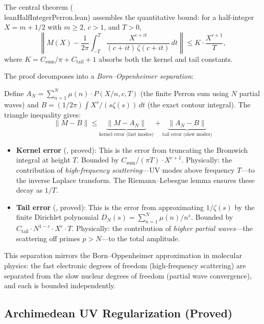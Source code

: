\documentclass[11pt,a4paper]{article}
\begin{document}
The central theorem 
(\\lean{HalfIntegerPerron.lean}) assembles the quantitative bound:
for a half-integer $X = m + 1/2$ with $m \geq 2$, $c > 1$, and $T > 0$,
\[
  \left\| M(X) - \frac{1}{2\pi} \int_{-T}^{T}
  \frac{X^{c+it}}{(c+it)\,\zeta(c+it)}\,dt \right\|
  \leq K \cdot \frac{X^{c+1}}{T},
\]
where $K = C_{\mathrm{sum}}/\pi + C_{\mathrm{tail}} + 1$ absorbs
both the kernel and tail constants.

The proof decomposes into a \emph{Born--Oppenheimer separation}:

\begin{correspondence}
\label{corr:born-oppenheimer}
Define $A_N = \sum_{n=1}^{N} \mu(n) \cdot P(X/n, c, T)$ (the finite
Perron sum using $N$ partial waves) and $B = (1/2\pi)\int X^s/(s\zeta(s))\,dt$
(the exact contour integral). The triangle inequality gives:
\[
  \|M - B\| \leq \underbrace{\|M - A_N\|}_{\text{kernel error (fast modes)}}
  + \underbrace{\|A_N - B\|}_{\text{tail error (slow modes)}}
\]
\begin{itemize}
  \item \textbf{Kernel error} (,
    proved): This is the error from truncating the Bromwich integral at
    height $T$. Bounded by $C_{\mathrm{sum}}/(\pi T) \cdot X^{c+1}$.
    Physically: the contribution of \emph{high-frequency scattering}---UV
    modes above frequency $T$---to the inverse Laplace transform. The
    Riemann--Lebesgue lemma ensures these decay as $1/T$.

  \item \textbf{Tail error} (,
    proved): This is the error from approximating $1/\zeta(s)$ by
    the finite Dirichlet polynomial $D_N(s) = \sum_{n=1}^{N} \mu(n)/n^s$.
    Bounded by $C_{\mathrm{tail}} \cdot N^{1-c} \cdot X^c \cdot T$.
    Physically: the contribution of \emph{higher partial waves}---the
    scattering off primes $p > N$---to the total amplitude.
\end{itemize}
This separation mirrors the Born--Oppenheimer approximation in molecular
physics: the fast electronic degrees of freedom (high-frequency scattering)
are separated from the slow nuclear degrees of freedom (partial wave convergence),
and each is bounded independently.
\end{correspondence}

\subsection{Archimedean UV Regularization (Proved)}
\end{document}
